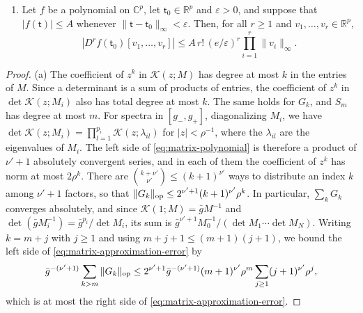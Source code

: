 \begin{lemma}
\begin{enumerate}[label=(\alph*)]
 $|\sum_{k=0}^m\mathcal S_k(\mathsf t)|\le C$ for every $m\ge0$ and every
 $\mathsf t\in\mathbb C^p$ with $\|\mathsf t-\mathsf t_0\|_\infty<\varepsilon$
 for some $\mathsf t_0\in\mathcal V$. The constants depend only on $g_\pm$,
 the maps $M_i$, the expression defining $\mathcal S$, and the bound on
 $\mathcal V$.
\item Let $f$ be a polynomial on $\mathbb C^p$, let
 $\mathsf t_0\in\mathbb R^p$ and $\varepsilon>0$, and suppose that $|f(\mathsf t)|\le A$
 whenever $\|\mathsf t-\mathsf t_0\|_\infty<\varepsilon$. Then, for all
 $r\ge1$ and $v_1,\ldots,v_r\in\mathbb R^p$,
 \[
  |D^rf(\mathsf t_0)[v_1,\ldots,v_r]|\le A\,r!\,(e/\varepsilon)^r
     \prod_{i=1}^r\|v_i\|_\infty .
 \]
\end{enumerate}
\end{lemma}
\begin{proof}
(a) The coefficient of $z^k$ in $\mathcal K(z;M)$ has degree at most $k$
in the entries of $M$. Since a determinant is a sum of products of
entries, the coefficient of $z^k$ in $\det\mathcal K(z;M_i)$ also has
total degree at most $k$. The same holds for $G_k$, and $S_m$ has degree
at most $m$. For spectra in
$[g_-,g_+]$, diagonalizing $M_i$, we have
$\det\mathcal K(z;M_i)=\prod_{l=1}^{p_i}\mathcal K(z;\lambda_{il})$ for
$|z|<\rho^{-1}$, where the $\lambda_{il}$ are the eigenvalues of $M_i$.
The left side of \eqref{eq:matrix-polynomial} is therefore a product of
$\nu'+1$ absolutely convergent series, and in each of them the coefficient
of $z^k$ has norm at most $2\rho^k$. There are
$\binom{k+\nu'}{\nu'}\le(k+1)^{\nu'}$ ways to distribute an index $k$
among $\nu'+1$ factors, so that
$\|G_k\|_{\rm op}\le2^{\nu'+1}(k+1)^{\nu'}\rho^k$. In particular,
$\sum_kG_k$ converges absolutely, and since $\mathcal K(1;M)=\bar gM^{-1}$
and $\det(\bar gM_i^{-1})=\bar g^{p_i}/\det M_i$, its sum is
$\bar g^{\nu'+1}M_0^{-1}/(\det M_1\cdots\det M_N)$. Writing $k=m+j$ with
$j\ge1$ and using $m+j+1\le(m+1)(j+1)$, we bound the left side of
\eqref{eq:matrix-approximation-error} by
\[
 \bar g^{-(\nu'+1)}\sum_{k>m}\|G_k\|_{\rm op}
 \le2^{\nu'+1}\bar g^{-(\nu'+1)}(m+1)^{\nu'}\rho^m
 \sum_{j\ge1}(j+1)^{\nu'}\rho^j,
\]
which is at most the right side of \eqref{eq:matrix-approximation-error}.


\end{proof}
